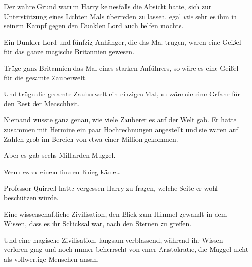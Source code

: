 Der wahre Grund warum Harry keinesfalls die Absicht hatte, sich zur Unterstützung eines Lichten Mals überreden zu lassen, egal \emph{wie} sehr es ihm in seinem Kampf gegen den Dunklen Lord auch helfen mochte.

Ein Dunkler Lord und fünfzig Anhänger, die das Mal trugen, waren eine Geißel für das ganze magische Britannien gewesen.

Trüge ganz Britannien das Mal eines starken Anführers, so wäre es eine Geißel für die gesamte Zauberwelt.

Und trüge die gesamte Zauberwelt ein einziges Mal, so wäre sie eine Gefahr für den Rest der Menschheit.

Niemand wusste ganz genau, wie viele Zauberer es auf der Welt gab. Er hatte zusammen mit Hermine ein paar Hochrechnungen angestellt und sie waren auf Zahlen grob im Bereich von etwa einer Million gekommen.

Aber es gab sechs Milliarden Muggel.

Wenn es zu einem finalen Krieg käme…

Professor Quirrell hatte vergessen Harry zu fragen, welche Seite er wohl beschützen würde.

Eine wissenschaftliche Zivilisation, den Blick zum Himmel gewandt in dem Wissen, dass es ihr Schicksal war, nach den Sternen zu greifen.

Und eine magische Zivilisation, langsam verblassend, während ihr Wissen verloren ging und noch immer beherrscht von einer Aristokratie, die Muggel nicht als vollwertige Menschen ansah.

